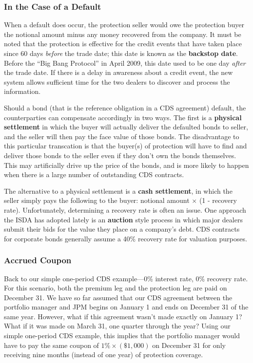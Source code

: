 \documentclass{jss}
\begin{document}
\subsubsection{In the Case of a Default}
\label{sec:SettlementType}

When a default does occur, the protection seller would owe the protection buyer the notional amount minus any money recovered from the company. It must be noted that the protection is effective for the credit events that have taken place since 60 days \textit{before} the trade date; this date is known as the \textbf{backstop date}. Before the ``Big Bang Protocol'' in April 2009, this date used to be one day \textit{after} the trade date. If there is a delay in awareness about a credit event, the new system allows sufficient time for the two dealers to discover and process the information. 

Should a bond (that is the reference obligation in a CDS agreement) default, the counterparties can compensate accordingly in two ways. The first is a \textbf{physical settlement} in which the buyer will actually deliver the defaulted bonds to seller, and the seller will then pay the face value of those bonds. The disadvantage to this particular transcation is that the buyer(s) of protection will have to find and deliver those bonds to the seller even if they don't own the bonds themselves. This may artificially drive up the price of the bonds, and is more likely to happen when there is a large number of outstanding CDS contracts. 

The alternative to a physical settlement is a \textbf{cash settlement}, in which the seller simply pays the following to the buyer: notional amount $\times$ (1 - recovery rate). Unfortunately, determining a recovery rate is often an issue. One approach the ISDA has adopted lately is an \textbf{auction} style process in which major dealers submit their bids for the value they place on a company's debt.  CDS contracts for corporate bonds generally assume a 40\% recovery rate for valuation purposes.

\subsubsection{Accrued Coupon}
\label{sec:AccruedCoupon}

Back to our simple one-period CDS example---0\% interest rate, 0\% recovery rate. For this scenario, both the premium leg and the protection leg are paid on December 31. We have so far assumed that our CDS agreement between the portfolio manager and JPM begins on January 1 and ends on December 31 of the same year. However, what if this agreement wasn't made exactly on January 1? What if it was made on March 31, one quarter through the year? Using our simple one-period CDS example, this implies that the portfolio manager would have to pay the same coupon of $1\% \times (\$1,000)$ on December 31 for only receiving nine months (instead of one year) of protection coverage.
\end{document}
